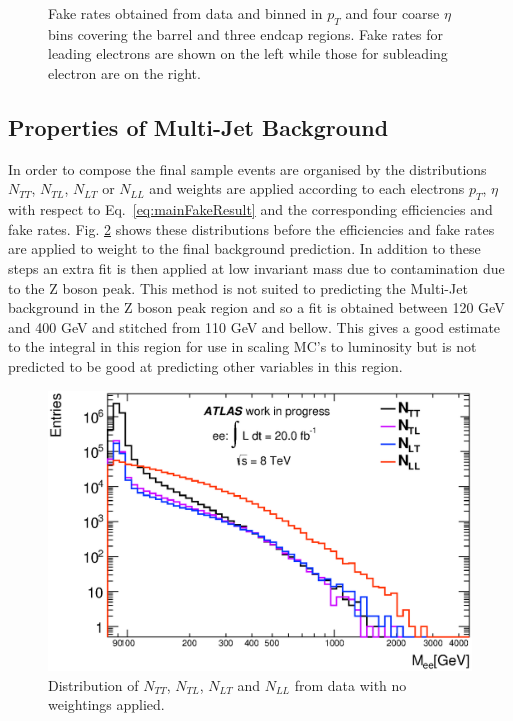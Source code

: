 \begin{figure}[h]
\begin{center}
      \end{center}
   \caption{Fake rates obtained from data and binned in $p_{T}$ and four coarse $\eta$ bins covering the barrel and three endcap regions. Fake rates for leading electrons are shown on the left while those for subleading electron are on the right.}
   \label{fig:fakeRates}
   \end{figure}




\subsection{Properties of Multi-Jet Background}

In order to compose the final sample events are organised by the distributions $N_{TT}$, $N_{TL}$, $N_{LT}$ or $N_{LL}$ and weights are applied according to each electrons $p_{T}$, $\eta$ with respect to Eq.~\ref{eq:mainFakeResult} and the corresponding efficiencies and fake rates. 
Fig. \ref{fig:N_dist} shows these distributions before the efficiencies and fake rates are applied to weight to the final background prediction. In addition to these steps an extra fit is then applied at low invariant mass due to contamination due to the Z boson peak. This method is not suited to predicting the Multi-Jet background in the Z boson peak region and so a fit is obtained between 120 GeV and 400 GeV and stitched from 110 GeV and bellow. This gives a good estimate to the integral in this region for use in scaling MC's to luminosity but is not predicted to be good at predicting other variables in this region.

   \begin{figure}[h]
      \begin{center}
      \includegraphics[scale=0.8]{images/N_distributions.eps}
      \end{center}
   \caption{Distribution of $N_{TT}$, $N_{TL}$, $N_{LT}$ and $N_{LL}$ from data with no weightings applied.}
   \label{fig:N_dist}
   \end{figure}






